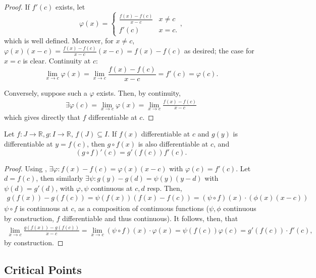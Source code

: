 \begin{proof}
    If $f'(c)$ exists, let \[
    \varphi(x) = \begin{cases}
        \frac{f(x) - f(c)}{x-c} & x \neq c\\
        f'(c) & x = c.
    \end{cases},    
    \]
    which is well defined. Moreover, for $x \neq c$, $\varphi(x)(x - c) = \frac{f(x)-f(c)}{x-c}(x-c) = f(x)-f(c)$ as desired; the case for $x = c$ is clear. Continuity at $c$:
    \[
    \lim_{x \to c} \varphi(x) = \lim_{x \to c} \frac{f(x) - f(c)}{x - c} = f'(c) = \varphi(c).    
    \]

    Conversely, suppose such a $\varphi$ exists. Then, by continuity, \begin{align*}
        \exists \varphi(c) = \lim_{x \to c} \varphi(x) = \lim_{x \to c}\frac{f(x)-f(c)}{x - c}
    \end{align*}
    which gives directly that $f$ differentiable at $c$.
\end{proof}

\begin{theorem}
    Let $f : J \to \mathbb{R}, g : I \to \mathbb{R}$, $f(J) \subseteq I$. If $f(x)$ differentiable at $c$ and $g(y)$ is differentiable at $y = f(c)$, then $g \circ f(x)$ is also differentiable at $c$, and \[
    (g\circ f)'(c) = g'(f(c))f'(c).    
    \]
\end{theorem}

\begin{proof}
    Using , $\exists \varphi : f(x) - f(c) = \varphi(x)(x-c)$ with $\varphi(c) = f'(c)$. Let $d = f(c)$, then similarly $\exists \psi :g(y)-g(d) = \psi(y)(y-d)$ with $\psi(d) = g'(d)$, with $\varphi, \psi$ continuous at $c, d$ resp. Then, \begin{align*}
        g(f(x))-g(f(c)) = \psi(f(x))(f(x)-f(c))=(\psi\circ f)(x)\cdot(\phi(x)(x-c))
    \end{align*}
    $\psi \circ f$ is continuous at $c$, as a composition of continuous functions ($\psi, \phi$ continuous by construction, $f$ differentiable and thus continuous). It follows, then, that \begin{align*}
        \lim_{x \to c} \frac{g(f(x)) - g(f(c))}{x - c} = \lim_{x \to c} (\psi\circ f)(x)\cdot\varphi(x) = \psi(f(c))\varphi(c) = g'(f(c))\cdot f'(c),
    \end{align*}
    by construction.
\end{proof}

\subsection{Critical Points}

